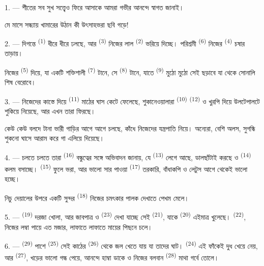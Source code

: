 1. --- শীতের সব সুখ সত্ত্বেও  ফিরে আসাকে আমরা গভীর আনন্দে
স্বাগত জানাই।

মে মাসে সন্ধ্যায় খামারের উঠান কী উৎসাহভরা ছবি গড়ে!

2. --- দিগন্তে  \textsuperscript{(1)} ধীরে ধীরে ঢলছে, আর
 \textsuperscript{(3)} নিজের লাল  \textsuperscript{(2)}
ভরিয়ে দিচ্ছে। পরিশ্রমী  \textsuperscript{(6)} নিজের
 \textsuperscript{(4)} চষার তাড়ায়।

নিজের  \textsuperscript{(5)} দিয়ে, যা একটি শক্তিশালী
 \textsuperscript{(7)} টানে, সে  \textsuperscript{(8)}
টানে, যাতে  \textsuperscript{(9)} মুঠো মুঠো সেই 
ছড়াবে যা থেকে সোনালি শিষ বেরোবে।

3. --- নিজেদের কাস্তে দিয়ে  \textsuperscript{(11)} মাঠের
ঘাস কেটে ফেলেছে, শুকানেওয়ালারা  \textsuperscript{(10)}
 \textsuperscript{(12)} ও খুরপি দিয়ে উলটেপালটে শুকিয়ে নিয়েছে,
আর এখন তারা ফিরছে।

কেউ কেউ বলদে টানা ভারী গাড়ির আগে আগে চলছে, কাঁধে নিজেদের যন্ত্রপাতি নিয়ে।
অন্যেরা, বেশি অলস, সুগন্ধি শুকনো ঘাসে আরাম করে গা এলিয়ে দিয়েছে।

4. --- চলতে চলতে তারা  \textsuperscript{(16)} বন্ধুত্বের সঙ্গে
অভিবাদন জানায়, যে  \textsuperscript{(13)} লেগে আছে,
 ডালছাঁটাই করছে ও  \textsuperscript{(14)}
কলম বসাচ্ছে।  \textsuperscript{(15)} ফুলে ভরা, আর ভালো
সার পাওয়া  \textsuperscript{(17)} তরকারি, বাঁধাকপি ও
লেটুস আগে থেকেই ভালো হচ্ছে।

নিচু দেয়ালের উপরে একটি সুন্দর  \textsuperscript{(18)} নিজের
চমৎকার পালক দেখাতে পেখম মেলে।

\VUsaut{3.0mm}

5. ---  \textsuperscript{(19)} দরজা খোলা, আর জাবপাত্র ও
 \textsuperscript{(23)} দেখা যাচ্ছে সেই 
\textsuperscript{(21)}, যাকে  \textsuperscript{(20)} এইমাত্র খুলেছে।
 \textsuperscript{(22)}, নিজের লম্বা পায়ে এত মজার, লাফাতে
লাফাতে মায়ের পিছনে চলে।

6. ---  \textsuperscript{(29)} পাশে 
\textsuperscript{(25)} সেই কাঠের  \textsuperscript{(26)} থেকে জল খেতে
যায় যা তাদের ঘাট।  \textsuperscript{(24)} এই ফাঁকেই দুধ খেয়ে
নেয়, আর  \textsuperscript{(27)}, খড়ের ভালো গন্ধ পেয়ে, আনন্দে
হাম্বা ডাকে ও নিজের বলবান  \textsuperscript{(28)} মাথা গর্বে
তোলে।

